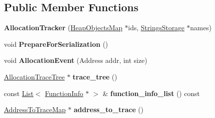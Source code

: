 \subsection*{Public Member Functions}
\begin{DoxyCompactItemize}
\item 
{\bfseries Allocation\+Tracker} (\hyperlink{classv8_1_1internal_1_1_heap_objects_map}{Heap\+Objects\+Map} $\ast$ids, \hyperlink{classv8_1_1internal_1_1_strings_storage}{Strings\+Storage} $\ast$names)\hypertarget{classv8_1_1internal_1_1_allocation_tracker_ae705bae00ff323c41efc0b1d50afc62c}{}\label{classv8_1_1internal_1_1_allocation_tracker_ae705bae00ff323c41efc0b1d50afc62c}

\item 
void {\bfseries Prepare\+For\+Serialization} ()\hypertarget{classv8_1_1internal_1_1_allocation_tracker_a06984664822efec67f15cfc200f9c1c8}{}\label{classv8_1_1internal_1_1_allocation_tracker_a06984664822efec67f15cfc200f9c1c8}

\item 
void {\bfseries Allocation\+Event} (Address addr, int size)\hypertarget{classv8_1_1internal_1_1_allocation_tracker_af59e0f4c414b6fe00ff0729e616ae219}{}\label{classv8_1_1internal_1_1_allocation_tracker_af59e0f4c414b6fe00ff0729e616ae219}

\item 
\hyperlink{classv8_1_1internal_1_1_allocation_trace_tree}{Allocation\+Trace\+Tree} $\ast$ {\bfseries trace\+\_\+tree} ()\hypertarget{classv8_1_1internal_1_1_allocation_tracker_aa0471186f074acec90232839b6e22431}{}\label{classv8_1_1internal_1_1_allocation_tracker_aa0471186f074acec90232839b6e22431}

\item 
const \hyperlink{classv8_1_1internal_1_1_list}{List}$<$ \hyperlink{structv8_1_1internal_1_1_allocation_tracker_1_1_function_info}{Function\+Info} $\ast$ $>$ \& {\bfseries function\+\_\+info\+\_\+list} () const \hypertarget{classv8_1_1internal_1_1_allocation_tracker_a25d10af2d1bde8601599623c34754b2e}{}\label{classv8_1_1internal_1_1_allocation_tracker_a25d10af2d1bde8601599623c34754b2e}

\item 
\hyperlink{classv8_1_1internal_1_1_address_to_trace_map}{Address\+To\+Trace\+Map} $\ast$ {\bfseries address\+\_\+to\+\_\+trace} ()\hypertarget{classv8_1_1internal_1_1_allocation_tracker_adacf25ec6310501fb4d9ae02c1737621}{}\label{classv8_1_1internal_1_1_allocation_tracker_adacf25ec6310501fb4d9ae02c1737621}

\end{DoxyCompactItemize}

